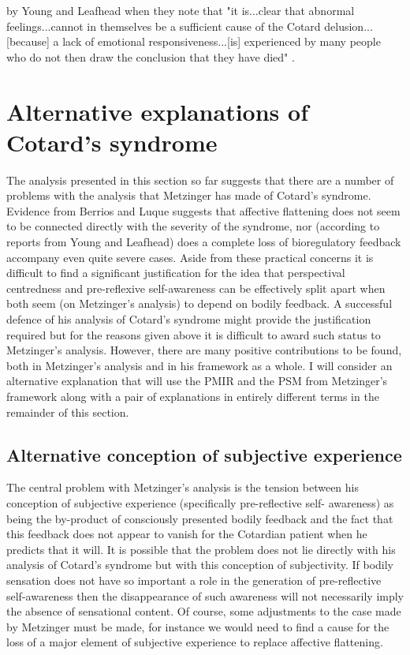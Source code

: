 by Young and Leafhead when they note that "it is...clear that abnormal feelings...cannot in themselves be a sufficient cause of the Cotard delusion...[because] a lack of emotional responsiveness...[is] experienced by many people who do not then draw the conclusion that they have died" \cite[pp. 164-165]{young1995}.

\section{Alternative explanations of Cotard's syndrome}
\label{psych_lit_alternatives}

The analysis presented in this section so far suggests that there are a number of problems with the analysis that Metzinger has made of Cotard's syndrome. Evidence from Berrios and Luque suggests that affective flattening does not seem to be connected directly with the severity of the syndrome, nor (according to reports from Young and Leafhead) does a complete loss of bioregulatory feedback accompany even quite severe cases. Aside from these practical concerns it is difficult to find a significant justification for the idea that perspectival centredness and pre-reflexive self-awareness can be effectively split apart when both seem (on Metzinger's analysis) to depend on bodily feedback. A successful defence of his analysis of Cotard's syndrome might provide the justification required but for the reasons given above it is difficult to award such status to Metzinger's analysis. However, there are many positive contributions to be found, both in Metzinger's analysis and in his framework as a whole. I will consider an alternative explanation that will use the PMIR and the PSM from Metzinger's framework along with a pair of explanations in entirely different terms in the remainder of this section.

\subsection{Alternative conception of subjective experience}

The central problem with Metzinger's analysis is the tension between his conception of subjective experience (specifically pre-reflective self- awareness) as being the by-product of consciously presented bodily feedback and the fact that this feedback does not appear to vanish for the Cotardian patient when he predicts that it will. It is possible that the problem does not lie directly with his analysis of Cotard's syndrome but with this conception of subjectivity. If bodily sensation does not have so important a role in the generation of pre-reflective self-awareness then the disappearance of such awareness will not necessarily imply the absence of sensational content. Of course, some adjustments to the case made by Metzinger must be made, for instance we would need to find a cause for the loss of a major element of subjective experience to replace affective flattening.

